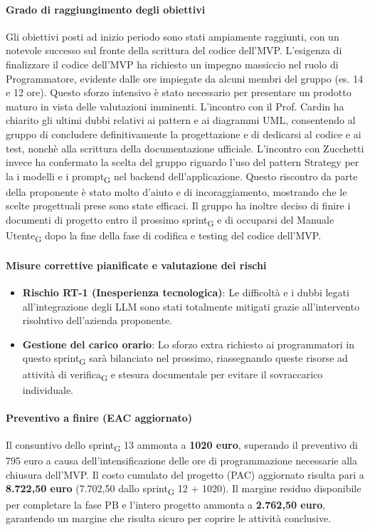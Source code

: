 \documentclass[11pt,a4paper]{article}
\newcommand{\gls}[1]{#1\textsubscript{G}}
\begin{document}
\paragraph{Grado di raggiungimento degli obiettivi}
Gli obiettivi posti ad inizio periodo sono stati ampiamente raggiunti, con un notevole successo sul fronte della scrittura del codice dell'MVP. L'esigenza di finalizzare il codice dell'MVP ha richiesto un impegno massiccio nel ruolo di Programmatore, evidente dalle ore impiegate da alcuni membri del gruppo (es. 14 e 12 ore). Questo sforzo intensivo è stato necessario per presentare un prodotto maturo in vista delle valutazioni imminenti.
L'incontro con il Prof. Cardin ha chiarito gli ultimi dubbi relativi ai pattern e ai diagrammi UML, consentendo al gruppo di concludere definitivamente la progettazione e di dedicarsi al codice e ai test, nonchè alla scrittura della documentazione ufficiale.
L'incontro con Zucchetti invece ha confermato la scelta del gruppo riguardo l'uso del pattern Strategy per la i modelli e i \gls{prompt} nel backend dell'applicazione. Questo riscontro da parte della proponente è stato molto d'aiuto e di incoraggiamento, mostrando che le scelte progettuali prese sono state efficaci.
Il gruppo ha inoltre deciso di finire i documenti di progetto entro il prossimo \gls{sprint} e di occuparsi del \gls{Manuale Utente} dopo la fine della fase di codifica e testing del codice dell'MVP.


\paragraph{Misure correttive pianificate e valutazione dei rischi}
\begin{itemize}
    \item \textbf{Rischio RT-1 (Inesperienza tecnologica)}: Le difficoltà e i dubbi legati all'integrazione degli LLM sono stati totalmente mitigati grazie all'intervento risolutivo dell'azienda proponente.
    \item \textbf{Gestione del carico orario}: Lo sforzo extra richiesto ai programmatori in questo \gls{sprint} sarà bilanciato nel prossimo, riassegnando queste risorse ad attività di \gls{verifica} e stesura documentale per evitare il sovraccarico individuale.
\end{itemize}

\paragraph{Preventivo a finire (EAC aggiornato)}
Il consuntivo dello \gls{sprint} 13 ammonta a \textbf{1020 euro}, superando il preventivo di 795 euro a causa dell'intensificazione delle ore di programmazione necessarie alla chiusura dell'MVP.
Il costo cumulato del progetto (PAC) aggiornato risulta pari a \textbf{8.722,50 euro} (7.702,50 dallo \gls{sprint} 12 + 1020). 
Il margine residuo disponibile per completare la fase PB e l'intero progetto ammonta a \textbf{2.762,50 euro}, garantendo un margine che risulta sicuro per coprire le attività conclusive.
\end{document}

